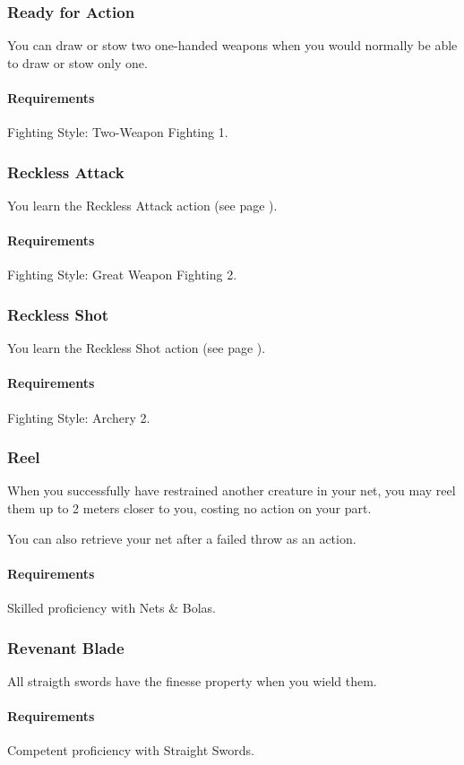 \subsubsection{Ready for Action} \label{feat::readyforaction}
    You can draw or stow two one-handed weapons when you would normally be able to draw or stow only one.
    \paragraph{Requirements} Fighting Style: Two-Weapon Fighting 1.
\subsubsection{Reckless Attack} \label{feat::recklessattack}
    You learn the Reckless Attack action (see page \pageref{act::recklessattack}).
    \paragraph{Requirements} Fighting Style: Great Weapon Fighting 2.
\subsubsection{Reckless Shot} \label{feat::recklessshot}
    You learn the Reckless Shot action (see page \pageref{act::recklessshot}).
    \paragraph{Requirements} Fighting Style: Archery 2.
\subsubsection{Reel} \label{feat::reel}
    When you successfully have restrained another creature in your net, you may reel them up to 2 meters closer to you, costing no action on your part.

    You can also retrieve your net after a failed throw as an action.
    \paragraph{Requirements} Skilled proficiency with Nets \& Bolas.
\subsubsection{Revenant Blade} \label{feat::revenantblade}
    All straigth swords have the finesse property when you wield them.
    \paragraph{Requirements} Competent proficiency with Straight Swords.
